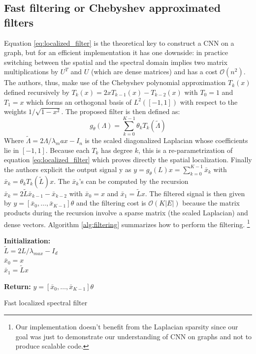\subsection{Fast filtering or Chebyshev approximated filters}
%
Equation \ref{eq:localized_filter} is the theoretical key to construct a CNN on a graph, but for an efficient implementation it has one downside: in practice switching between the spatial and the spectral domain implies two matrix multiplications by $U^T$ and $U$ (which are dense matrices) and has a cost $\mathcal{O}(n^2)$. The authors, thus, make use of the Chebyshev polynomial approximation $T_k(x)$ defined recursively by $T_k(x) = 2xT_{k-1}(x) - T_{k-2}(x)$ with $T_0=1$ and $T_1 = x$ which forms an orthogonal basis of $L^2([-1,1])$ with respect to the weights $1/\sqrt{1 - x^2}$. The proposed filter is then defined as:
\begin{equation}
    g_\theta(\Lambda) = \sum_{k=0}^{K-1} \theta_k T_k(\tilde \Lambda) \label{eq:localized_filter}
\end{equation}
%
Where $\tilde \Lambda = 2\Lambda / \lambda_max - I_n$ is the scaled diagonalized Laplacian whose coefficients lie in $[-1, 1]$. Because each $T_k$ has degree $k$, this is a re-parametrization of equation \ref{eq:localized_filter} which proves directly the spatial localization. Finally the authors explicit the output signal y as $y = g_\theta(L)x = \sum_{k=0}^{K-1} \bar x_k$ with $\bar x_k = \theta_k T_k(\tilde L) x$. The $\bar x_k$'s can be computed by the recursion $\bar x_k = 2 \tilde L \bar x_{k-1} - \bar x_{k-2}$ with $\bar x_0 = x$ and $\bar x_1 = \tilde L x$. The filtered signal is then given by $y = [\bar x_0, \dots, \bar x_{K-1}]\theta$ and the filtering cost is $\mathcal{O}(K|E|)$ because the matrix products during the recursion involve a sparse matrix (the scaled Laplacian) and dense vectors. Algorithm \ref{alg:filtering} summarizes how to perform the filtering. \footnote{Our implementation doesn't benefit from the Laplacian sparsity since our goal was just to demonstrate our understanding of CNN on graphs and not to produce scalable code.}\\

\begin{algorithm}[ht]
 
 \textbf{Initialization:}\\
    $\tilde{L} = 2 L / \lambda_{max} - I_d$ \\
    $\bar{x}_0 = x$ \\
    $\bar{x}_1 = \tilde{L}x$
 
 \textbf{Return:} $y = [\bar{x}_0, \ldots, \bar{x}_{K-1}] \theta$
 \caption{Fast localized spectral filter}
 \label{alg:filtering}
\end{algorithm}

